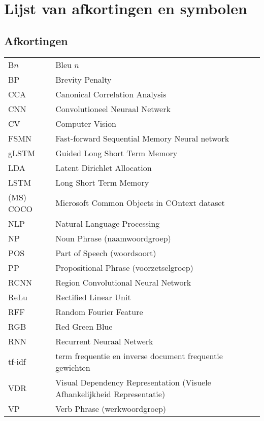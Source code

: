 \documentclass[master=cws,masteroption=ai]{kulemt}
\begin{document}
\begin{preface}
\end{preface}

\tableofcontents*

\begin{abstract}
\end{abstract}

\listoffiguresandtables
\chapter{Lijst van afkortingen en symbolen}
\section*{Afkortingen}
\begin{flushleft}
  \renewcommand{\arraystretch}{1.1}
  \begin{tabularx}{\textwidth}{@{}p{25mm}X@{}}
  	B$n$ & Bleu $n$\\
  	BP & Brevity Penalty\\
  	CCA & Canonical Correlation Analysis \\
  	CNN & Convolutioneel Neuraal Netwerk \\
  	CV & Computer Vision \\
  	FSMN & Fast-forward Sequential Memory Neural network\\
  	gLSTM & Guided Long Short Term Memory \\
    LDA  & Latent Dirichlet Allocation \\
    LSTM & Long Short Term Memory \\
    (MS) COCO & Microsoft Common Objects in COntext dataset\\
    NLP & Natural Language Processing\\
    NP & Noun Phrase (naamwoordgroep)\\
    POS & Part of Speech (woordsoort)\\
    PP & Propositional Phrase (voorzetselgroep)\\
    RCNN & Region Convolutional Neural Network \\
    ReLu & Rectified Linear Unit\\
    RFF & Random Fourier Feature \\
    RGB & Red Green Blue\\
    RNN & Recurrent Neuraal Netwerk \\
    tf-idf & term frequentie en inverse document frequentie gewichten \\
	VDR & Visual Dependency Representation (Visuele Afhankelijkheid Representatie)\\
	VP & Verb Phrase (werkwoordgroep)\\

  \end{tabularx}
\end{flushleft}
\end{document}

